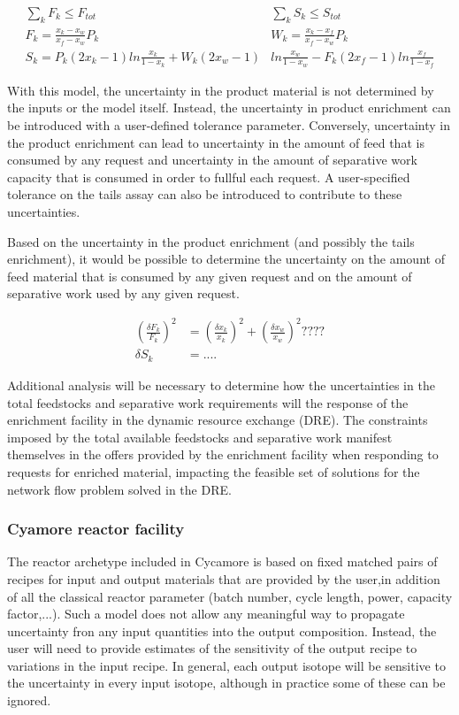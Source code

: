 \documentclass[dvips,12pt]{article}
\newcommand{\unc}[1]
{ \delta #1 }
\newcommand{\uncratio}[1]
{ \left(\frac{\unc{#1}}{#1}\right) }
\newcommand{\uncratiosq}[1]
{ \uncratio{#1}^2 }
\begin{document}
\begin{align*}
  \sum_k{F_k} \leq F_{tot}\qquad\qquad
  &\sum_k{S_k} \leq S_{tot}\\
  F_k = \frac{x_k - x_w}{x_f - x_w} P_k\qquad\qquad\qquad
  &W_k = \frac{x_k - x_f}{x_f - x_w} P_k\\
  S_k =  P_k\left(2x_k-1\right)ln\frac{x_k}{1-x_k}
         +W_k\left(2x_w-1\right)&ln\frac{x_w}{1-x_w}  
         -F_k\left(2x_f-1\right)ln\frac{x_f}{1-x_f}
\end{align*}

With this model, the uncertainty in the product
material is not determined by the inputs or the
model itself.  Instead, the uncertainty in product
enrichment can be introduced with a user-defined
tolerance parameter.  Conversely, uncertainty in
the product enrichment can lead to uncertainty in
the amount of feed that is consumed by any request
and uncertainty in the amount of separative work
capacity that is consumed in order to fullful each
request.  A user-specified tolerance on the tails
assay can also be introduced to contribute to
these uncertainties.

Based on the uncertainty in the product enrichment
(and possibly the tails enrichment), it would be
possible to determine the uncertainty on the
amount of feed material that is consumed by any
given request and on the amount of separative work
used by any given request.

\begin{align*}
  \uncratiosq{F_k} &= \uncratiosq{x_k} + \uncratiosq{x_w} ????\\
  \delta S_k &= ....
\end{align*}

Additional analysis will be necessary to determine
how the uncertainties in the total feedstocks and
separative work requirements will the response of
the enrichment facility in the dynamic resource
exchange (DRE).  The constraints imposed by the
total available feedstocks and separative work
manifest themselves in the offers provided by the
enrichment facility when responding to requests
for enriched material, impacting the feasible set
of solutions for the network flow problem solved
in the DRE.

\subsubsection{Cyamore reactor facility}

The reactor archetype included in Cycamore is
based on fixed matched pairs of recipes for input
and output materials that are provided by the
user,in addition of all the classical reactor
parameter (batch number, cycle length, power,
capacity factor,...).  Such a model does not allow
any meaningful way to propagate uncertainty fron
any input quantities into the output composition.
Instead, the user will need to provide estimates
of the sensitivity of the output recipe to
variations in the input recipe.  In general, each
output isotope will be sensitive to the
uncertainty in every input isotope, although in
practice some of these can be ignored.
\end{document}
